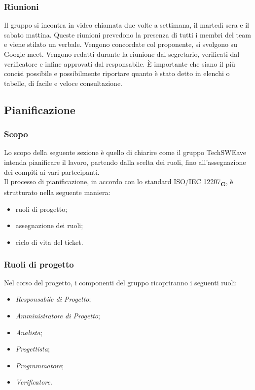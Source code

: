 \subsubsection{Riunioni}
Il gruppo si incontra in video chiamata due volte a settimana, il martedì sera e il sabato mattina. Queste riunioni prevedono la presenza di tutti i membri del team e viene stilato un verbale.
Vengono concordate col proponente, si svolgono su Google meet.
Vengono redatti durante la riunione dal segretario, verificati dal verificatore e infine approvati dal responsabile. \`E importante che siano il più concisi possibile e possibilmente riportare quanto è stato detto in elenchi o tabelle, di facile e veloce consultazione.
\subsection{Pianificazione}
\subsubsection{Scopo}
Lo scopo della seguente sezione è quello di chiarire come il gruppo TechSWEave intenda pianificare il lavoro, partendo dalla scelta dei ruoli, fino all'assegnazione dei compiti ai vari partecipanti.\\
Il processo di pianificazione, in accordo con lo standard ISO/IEC 12207\textsubscript{\textbf{G}}, è strutturato nella seguente maniera:
\begin {itemize}
\item ruoli di progetto;
\item assegnazione dei ruoli;
\item ciclo di vita del ticket.
\end {itemize}
\subsubsection{Ruoli di progetto}
Nel corso del progetto, i componenti del gruppo ricopriranno i seguenti ruoli:
\begin {itemize}
\item \textit{Responsabile di Progetto};
\item \textit{Amministratore di Progetto};
\item \textit{Analista};
\item \textit{Progettista};
\item \textit{Programmatore};
\item \textit{Verificatore}.
\end {itemize}

